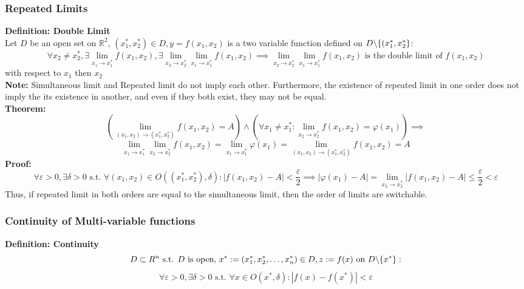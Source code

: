 \documentclass{article}
\newcommand{\R}{\mathbb{R}}
\newcommand{\st}{\mbox{ s.t. }}
\newcommand{\0}{{\bf{0}}}
\begin{document}
\subsubsection{Repeated Limits}
\textbf{Definition: Double Limit}\\
Let $D$ be an open set on $\R^2$, $(x_1^*,x_2^*)\in D,y=f(x_1,x_2)$ is a two variable function defined on $D\symbol{92}\{(x_1^*,x_2^*\}$: 
$$\forall x_2\neq x_2^*,\exists\lim_{x_1\to x_1^*}f(x_1,x_2),\exists\lim_{x_2\to x_2^*}\lim_{x_1\to x_1^*}f(x_1,x_2)\implies\lim_{x_2\to x_2^*}\lim_{x_1\to x_1^*}f(x_1,x_2)\mbox{ is the double limit of }f(x_1,x_2)$$
with respect to $x_1$ then $x_2$\\
\textbf{Note:} Simultaneous limit and Repeated limit do not imply each other. Furthermore, the existence of repeated limit in one order does not imply the its existence in another, and even if they both exist, they may not be equal.\\
\textbf{Theorem:}
$$\left(\lim_{(x_1,x_2)\to(x_1^*,x_2^*)}f(x_1,x_2)=A\right)\land\left(\forall x_1\neq x_1^*:\lim_{x_2\to x_2^*}f(x_1,x_2)=\varphi(x_1)\right)\implies$$
$$\lim_{x_1\to x_1^*}\lim_{x_2\to x_2^*}f(x_1,x_2)=\lim_{x_1\to x_1^*}\varphi(x_1)=\lim_{(x_1,x_2)\to(x_1^*,x_2^*)}f(x_1,x_2)=A$$
\textbf{Proof:}
$$\forall\varepsilon>0,\exists\delta>0\st\forall(x_1,x_2)\in O((x_1^*,x_2^*),\delta):|f(x_1,x_2)-A|<\frac{\varepsilon}{2}\implies|\varphi(x_1)-A|=\lim_{x_2\to x_2^*}|f(x_1,x_2)-A|\le\frac{\varepsilon}{2}<\varepsilon$$
Thus, if repeated limit in both orders are equal to the simultaneous limit, then the order of limits are switchable.
\subsubsection{Continuity of Multi-variable functions}
\textbf{Definition: Continuity}
$$D\subset R^n\st D\mbox{ is open, }x^*:=(x_1^*,x_2^*,\dots,x_n^*)\in D,z:=f(x)\mbox{ on }D\symbol{92}\{x^*\}:$$
$$\forall\varepsilon>0,\exists\delta>0\st\forall x\in O(x^*,\delta):|f(x)-f(x^*)|<\varepsilon$$
\end{document}
